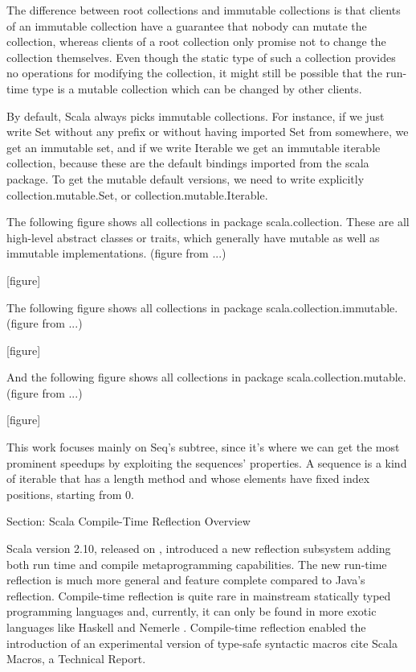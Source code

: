 The difference between root collections and immutable collections is that
clients of an immutable collection have a guarantee that nobody can mutate the
collection, whereas clients of a root collection only promise not to change the
collection themselves. Even though the static type of such a collection provides
no operations for modifying the collection, it might still be possible that the
run-time type is a mutable collection which can be changed by other clients.

By default, Scala always picks immutable collections. For instance, if we just
write Set without any prefix or without having imported Set from somewhere, we
get an immutable set, and if we write Iterable we get an immutable iterable
collection, because these are the default bindings imported from the scala
package. To get the mutable default versions, we need to write explicitly
collection.mutable.Set, or collection.mutable.Iterable.

The following figure shows all collections in package scala.collection. These
are all high-level abstract classes or traits, which generally have mutable as
well as immutable implementations. (figure from ...)

[figure]

The following figure shows all collections in package
scala.collection.immutable. (figure from ...)

[figure]

And the following figure shows all collections in package
scala.collection.mutable. (figure from ...)

[figure]

This work focuses mainly on Seq's subtree, since it's where we can get the
most prominent speedups by exploiting the sequences' properties. A sequence is a
kind of iterable that has a length method and whose elements have fixed index
positions, starting from 0.


Section: Scala Compile-Time Reflection Overview

Scala version 2.10, released on , introduced a new reflection
subsystem adding both run time and compile metaprogramming capabilities. The new
run-time reflection is much more general and feature complete compared to Java's
reflection. Compile-time reflection is quite rare in mainstream statically typed
programming languages and, currently, it can only be found in more exotic
 languages like Haskell 
and Nemerle . Compile-time reflection enabled the
introduction
of an experimental version of type-safe syntactic macros {cite Scala Macros, a
Technical Report}. 

